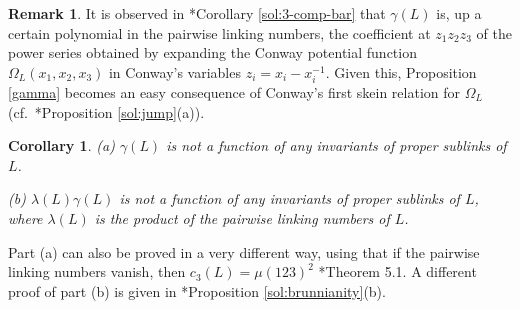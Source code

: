 \documentclass[a4paper,12pt,reqno,oneside]{amsart} %
\theoremstyle{plain}
\newtheorem{corollary}[theorem]{Corollary}
\theoremstyle{definition}
\newtheorem{remark}[theorem]{Remark}
\theoremstyle{named}
\renewcommand{\:}{\colon}
\begin{document}
\begin{remark} It is observed in \cite{Msol}*{Corollary \ref{sol:3-comp-bar}} that $\gamma(L)$ is, up a certain polynomial in the pairwise
linking numbers, the coefficient at $z_1z_2z_3$ of the power series obtained by expanding the Conway potential function $\Omega_L(x_1,x_2,x_3)$
in Conway's variables $z_i=x_i-x_i^{-1}$.
Given this, Proposition \ref{gamma} becomes an easy consequence of Conway's first skein relation for $\Omega_L$
(cf.\ \cite{Msol}*{Proposition \ref{sol:jump}(a)}).
\end{remark}

\begin{corollary} \label{brunnianity}
(a) $\gamma(L)$ is not a function of any invariants of proper sublinks of $L$.

(b) $\lambda(L)\gamma(L)$ is not a function of any invariants of proper sublinks of $L$, where $\lambda(L)$
is the product of the pairwise linking numbers of $L$.
\end{corollary}

Part (a) can also be proved in a very different way, using that if the pairwise linking numbers vanish, then $c_3(L)=\mu(123)^2$ \cite{Co2}*{Theorem 5.1}.
A different proof of part (b) is given in \cite{Msol}*{Proposition \ref{sol:brunnianity}(b)}.
\end{document}
